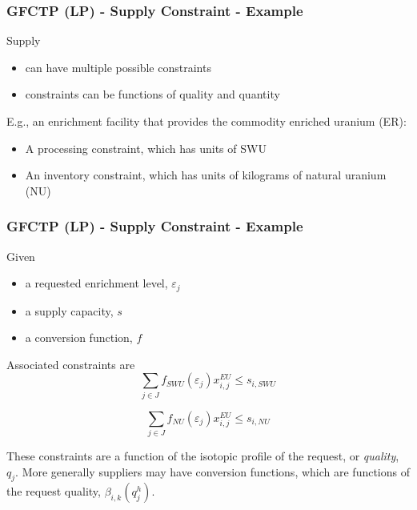 \begin{frame}[ctb!]
  \frametitle{GFCTP (LP) - Supply Constraint - Example}

  Supply
  \begin{itemize}
    \item can have multiple possible constraints
    \item constraints can be functions of quality and quantity
  \end{itemize}

  E.g., an enrichment facility that provides the commodity enriched uranium (ER):
  \begin{itemize}
    \item A processing constraint, which has units of SWU
    \item An inventory constraint, which has units of kilograms of natural
      uranium (NU)
  \end{itemize}

\end{frame}

\begin{frame}[ctb!]
  \frametitle{GFCTP (LP) - Supply Constraint - Example}
  
  Given
  \begin{itemize}
    \item a requested enrichment level, $\varepsilon_j$
    \item a supply capacity, $s$
    \item a conversion function, $f$
  \end{itemize}

  Associated constraints are
  \begin{equation}
    \sum_{j \in J} f_{SWU}(\varepsilon_j) x_{i,j}^{EU} \leq s_{i,SWU} 
  \end{equation}

  \begin{equation}
    \sum_{j \in J} f_{NU}(\varepsilon_j) x_{i,j}^{EU} \leq s_{i,NU} 
  \end{equation}

  \pause

  These constraints are a function of the isotopic profile of the request, or
  \textit{quality}, $q_j$. More generally suppliers may have conversion
  functions, which are functions of the request quality,
  $\beta_{i,k}(q_{j}^{h})$.

\end{frame}

